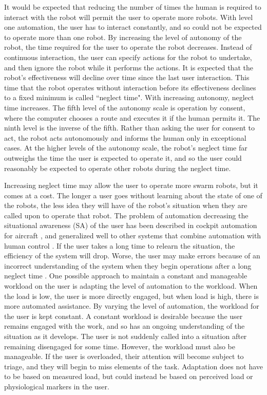 It would be expected that reducing the number of times the human is required to interact with the robot will permit the user to operate more robots.
With level one automation, the user has to interact constantly, and so could not be expected to operate more than one robot. 
By increasing the level of autonomy of the robot, the time required for the user to operate the robot decreases.
Instead of continuous interaction, the user can specify actions for the robot to undertake, and then ignore the robot while it performs the actions.
It is expected that the robot's effectiveness will decline over time since the last user interaction. 
This time that the robot operates without interaction before its effectiveness declines to a fixed minimum is called ``neglect time"\citep{olsen2003metrics}.
With increasing autonomy, neglect time increases.
The fifth level of the autonomy scale is operation by consent, where the computer chooses a route and executes it if the human permits it. 
The ninth level is the inverse of the fifth.
Rather than asking the user for consent to act, the robot acts autonomously and informs the human only in exceptional cases.
At the higher levels of the autonomy scale, the robot's neglect time far outweighs the time the user is expected to operate it, and so the user could reasonably be expected to operate other robots during the neglect time. 

Increasing neglect time may allow the user to operate more swarm robots, but it comes at a cost. 
The longer a user goes without learning about the state of one of the robots, the less idea they will have of the robot's situation when they are called upon to operate that robot. 
The problem of automation decreasing the situational awareness (SA) of the user has been described in cockpit automation for aircraft \citep{wiener1980flight}, and generalized well to other systems that combine automation with human control \citep{kaber1997out}. 
If the user takes a long time to relearn the situation, the efficiency of the system will drop. 
Worse, the user may make errors because of an incorrect understanding of the system when they begin operations after a long neglect time \citep{cummings2008predicting}. 
One possible approach to maintain a constant and manageable workload on the user is adapting the level of automation to the workload. 
When the load is low, the user is more directly engaged, but when load is high, there is more automated assistance. 
By varying the level of automation, the workload for the user is kept constant. 
A constant workload is desirable because the user remains engaged with the work, and so has an ongoing understanding of the situation as it develops. 
The user is not suddenly called into a situation after remaining disengaged for some time. 
However, the workload must also be manageable. 
If the user is overloaded, their attention will become subject to triage, and they will begin to miss elements of the task. 
Adaptation does not have to be based on measured load, but could instead be based on perceived load or physiological markers in the user. 

